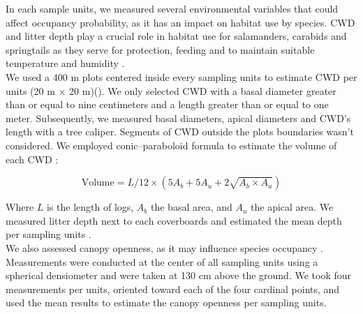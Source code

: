 In each sample units, we measured several environmental variables that could affect occupancy probability, as it has an impact on habitat use by species.
CWD and litter depth play a crucial role in habitat use for salamanders, carabids and springtails as
they serve for protection, feeding and to maintain suitable temperature and humidity \citep{birdChangesSoilLitter2004,groverInfluenceCoverMoisture1998a,harmonEcologyCoarseWoody1986,koivula.LeafLitterSmallscale1999,mckennyEffectsStructuralComplexity2006,patrickEffectsExperimentalForestry2006a}. \\
We used a 400 m plots centered inside every sampling units to estimate CWD per units (20 m $\times$  20 m)(\citealp{methotGuideInventaireEchantillonnage2014}). 
We only selected CWD with a basal diameter greater than or equal to nine centimeters and a length greater than or equal to one meter.
Subsequently, we measured basal diameters, apical diameters and CWD's length with a tree caliper. 
Segments of CWD outside the plots boundaries wasn't considered.
We employed \cite{fraverRefiningVolumeEstimates2007} conic–paraboloid formula to estimate the volume of each CWD :

\begin{equation}
  \text{Volume} = L/12 \times (5A_b + 5A_u + 2\sqrt{A_b \times A_u})
\end{equation}

\vspace{0.5cm}

Where $L$ is the length of logs, $A_b$ the basal area, and $A_u$ the apical area.
We measured litter depth next to each coverboards and estimated the mean depth per sampling units \citep{mazerolleWoodlandSalamanderPopulation2021a}. \\
We also assessed canopy openness, as it may influence species occupancy \citep{henneronForestPlantCommunity2017,koivulaBorealCarabidbeetleColeoptera2002a,kotzeFortyYearsCarabid2011a,messereForestFloorDistribution1998,tilghmanMetaanalysisEffectsCanopy2012}.
Measurements were conducted at the center of all sampling units using a spherical densiometer \citep{lemmonSphericalDensiometerEstimating1956} and were taken at 130 cm above the ground. 
We took four measurements per units, oriented toward each of the four cardinal points, and used the mean results to estimate the canopy openness per sampling units.

